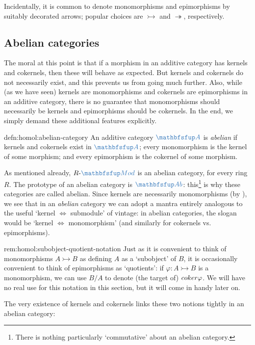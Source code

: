 Incidentally, it is common to denote monomorphisms and epimorphisms by
suitably decorated arrows; popular choices are $\rightarrowtail$ and
$\twoheadrightarrow$, respectively.

\subsection{Abelian categories}
\label{subsec:homol:abelian-categories}
The moral at this point is that if a morphism in an additive category
has kernels and cokernels, then these will behave as expected. But
kernels and cokernels do not necessarily exist, and this prevents us
from going much further. Also, while (as we have seen) kernels are
monomorphisms and cokernels are epimorphisms in an additive category,
there is no guarantee that monomorphisms should necessarily be kernels
and epimorphisms should be cokernels. In the end, we simply demand
these additional features explicitly.
\begin{defn}{}{defn:homol:abelian-category}
  An additive category $\categ{A}$ is \emph{abelian} if kernels and
  cokernels exist in $\categ{A}$; every monomorphism is the kernel of
  some morphism; and every epimorphism is the cokernel of some
  morphism.
\end{defn}
As mentioned already, $R\text{-}\categ{Mod}$ is an abelian category,
for every ring $R$. The prototype of an abelian category is
$\categ{Ab}$: this\footnote{There is nothing particularly
  `commutative' about an abelian category.} is why these categories
are called abelian.  Since kernels are necessarily monomorphisms (by
), we see that in an \emph{abelian} category we
can adopt a mantra entirely analogous to the useful `kernel $\iff$
submodule' of  vintage:
in abelian categories, the slogan would be `kernel $\iff$
monomorphism' (and similarly for cokernels vs.  epimorphisms).
\begin{rem}{}{rem:homol:subobject-quotient-notation}
  Just as it is convenient to think of monomorphisms
  $A \rightarrowtail B$ as defining $A$ as a `subobject' of $B$, it is
  occasionally convenient to think of epimorphisms as `quotients': if
  $\varphi : A \rightarrowtail B$ is a monomorphism, we can use $B/A$
  to denote (the target of) $coker\varphi$. We will have no real use
  for this notation in this section, but it will come in handy later
  on.
\end{rem}
The very existence of kernels and cokernels links these two notions
tightly in an abelian category:


